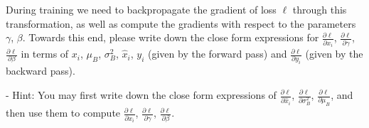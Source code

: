 \documentclass{article}
\begin{document}
During training we need to backpropagate the gradient of loss $\ell$ through this transformation, as well as compute the gradients with respect to the parameters $\gamma$, $\beta$.  Towards this end, please write down the close form expressions for $\frac{\partial \ell}{\partial x_i}$, $\frac{\partial \ell}{\partial \gamma}$, $\frac{\partial \ell}{\partial \beta}$ in terms of $x_i$, $\mu_B$, $\sigma_B^2$, ${\hat x}_i$, $y_i$ (given by the forward pass) and $\frac{\partial \ell}{\partial y_i}$ (given by the backward pass).

- Hint: You may first write down the close form expressions of $\frac{\partial \ell}{\partial {\hat x}_i}$, $\frac{\partial \ell}{\partial \sigma_B^2}$, $\frac{\partial \ell}{\partial \mu_B}$, and then use them to compute $\frac{\partial \ell}{\partial x_i}$, $\frac{\partial \ell}{\partial \gamma}$, $\frac{\partial \ell}{\partial \beta}$.
\end{document}

